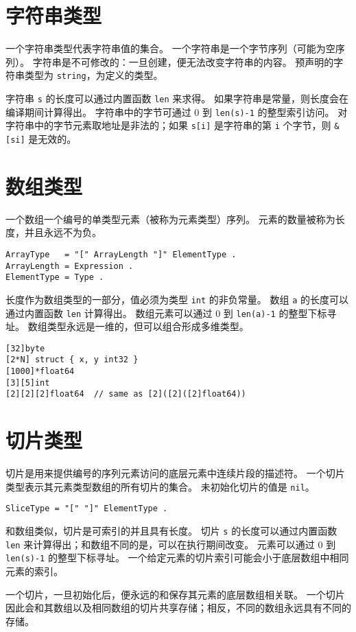 \section{字符串类型}
一个字符串类型代表字符串值的集合。
一个字符串是一个字节序列（可能为空序列）。
字符串是不可修改的：一旦创建，便无法改变字符串的内容。
预声明的字符串类型为 \lstinline|string|，为定义的类型。

字符串 \lstinline|s| 的长度可以通过内置函数 \lstinline|len| 来求得。
如果字符串是常量，则长度会在编译期间计算得出。
字符串中的字节可通过 0 到 \lstinline|len(s)-1| 的整型索引访问。
对字符串中的字节元素取地址是非法的；如果 \lstinline|s[i]| 是字符串的第 \lstinline|i| 个字节，则 \lstinline|&[si]| 是无效的。

\section{数组类型}
一个数组一个编号的单类型元素（被称为元素类型）序列。
元素的数量被称为长度，并且永远不为负。
\begin{lstlisting}[style=EBNF]
ArrayType   = "[" ArrayLength "]" ElementType .
ArrayLength = Expression .
ElementType = Type .
\end{lstlisting}
长度作为数组类型的一部分，值必须为类型 \lstinline|int| 的非负常量。
数组 \lstinline|a| 的长度可以通过内置函数 \lstinline|len| 计算得出。
数组元素可以通过 0 到 \lstinline|len(a)-1| 的整型下标寻址。
数组类型永远是一维的，但可以组合形成多维类型。
\begin{lstlisting}[style=golang]
[32]byte
[2*N] struct { x, y int32 }
[1000]*float64
[3][5]int
[2][2][2]float64  // same as [2]([2]([2]float64))
\end{lstlisting}


\section{切片类型}
切片是用来提供编号的序列元素访问的底层元素中连续片段的描述符。
一个切片类型表示其元素类型数组的所有切片的集合。
未初始化切片的值是 \lstinline|nil|。
\begin{lstlisting}[style=EBNF]
SliceType = "[" "]" ElementType .
\end{lstlisting}
和数组类似，切片是可索引的并且具有长度。
切片 \lstinline|s| 的长度可以通过内置函数 \lstinline|len| 来计算得出；和数组不同的是，可以在执行期间改变。
元素可以通过 0 到 \lstinline|len(s)-1| 的整型下标寻址。
一个给定元素的切片索引可能会小于底层数组中相同元素的索引。

一个切片，一旦初始化后，便永远的和保存其元素的底层数组相关联。
一个切片因此会和其数组以及相同数组的切片共享存储；相反，不同的数组永远具有不同的存储。

